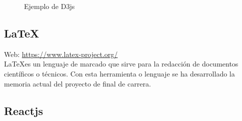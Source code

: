\begin{figure}[H]
  \caption{Ejemplo de D3js}
\end{figure}


\subsection{\LaTeX}

Web: \url{https://www.latex-project.org/}\\

\LaTeX es un lenguaje de marcado que sirve para la redacción de documentos científicos o técnicos. Con esta herramienta o lenguaje se ha desarrollado la memoria actual del proyecto de final de carrera.

\subsection{Reactjs}

